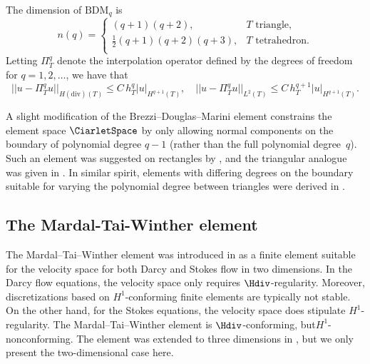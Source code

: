 The dimension of $\mathrm{BDM}_q$ is
\begin{equation}
  n(q) = \left \{
    \begin{array}{ll}
      (q + 1)(q + 2), & T \text{ triangle},  \\
      \frac{1}{2} (q + 1)(q + 2)(q + 3), & T \text{ tetrahedron}.\\
    \end{array}
    \right .
\end{equation}
Letting $\Pi_T^q$ denote the interpolation operator defined by the
degrees of freedom for $q = 1, 2, \dots$, we have that \citep[Chapter
  III.3]{BrezziFortin1991}
\begin{equation}
  ||u - \Pi_T^q u||_{H(\mathrm{div})(T)} \leqslant C \, h_T^{q} |u|_{H^{q+1}(T)}, \quad
  ||u - \Pi_T^q u||_{L^2(T)} \leqslant C \, h_T^{q+1} |u|_{H^{q+1}(T)}.
\end{equation}

A slight modification of the Brezzi--Douglas--Marini element
constrains the element space $\CiarletSpace$ by only allowing normal
components on the boundary of polynomial degree $q - 1$ (rather than
the full polynomial degree~$q$). Such an element was suggested on
rectangles by \citet{BrezziDouglasFortinEtAl1987}, and the triangular
analogue was given in \citet{BrezziFortin1991}. In similar spirit,
elements with differing degrees on the boundary suitable for varying
the polynomial degree between triangles were derived
in \citet{BrezziDouglasMarini1985a}.

\subsection{The Mardal-Tai-Winther element}

The Mardal--Tai--Winther element was introduced
in \citet{MardalTaiWinther2002} as a finite element suitable for the
velocity space for both Darcy and Stokes flow in two dimensions. In
the Darcy flow equations, the velocity space only requires
$\Hdiv$-regularity. Moreover, discretizations based on
$H^1$-conforming finite elements are typically not stable. On the
other hand, for the Stokes equations, the velocity space does
stipulate $H^1$-regularity. The Mardal--Tai--Winther element is
$\Hdiv$-conforming, but\break $H^1$-nonconforming. The element was extended
to three dimensions in \citet{TaiWinther2006}, but we only present the
two-dimensional case here.

